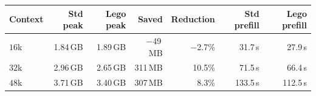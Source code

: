 \begin{tabular}{lrrrrrr}
\toprule
Context & Std peak & Lego peak & Saved & Reduction & Std prefill & Lego prefill \\
\midrule
$16$k & 1.84\,GB & 1.89\,GB & $-$49\,MB & $-$2.7\% & 31.7\,s & 27.9\,s \\
$32$k & 2.96\,GB & 2.65\,GB & 311\,MB   & 10.5\%   & 71.5\,s & 66.4\,s \\
$48$k & 3.71\,GB & 3.40\,GB & 307\,MB   & \phantom{0}8.3\%   & 133.5\,s & 112.5\,s \\
\bottomrule
\end{tabular}
